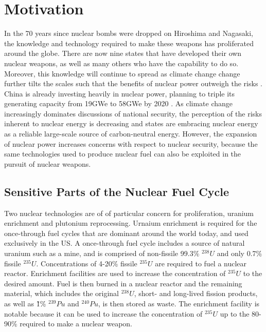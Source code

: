 \section{Motivation}
\label{s_motive}

In the 70 years since nuclear bombs were dropped on Hiroshima and Nagasaki, the knowledge and technology required to make these weapons has proliferated around the globe. There are now nine states that have developed their own nuclear weapons, as well as many others who have the capability to do so\cite{feiveson_unmaking_2014}.  Moreover, this knowledge will continue to spread as climate change change further tilts the scales such that the benefits of nuclear power outweigh the risks \cite{mooney_why_2014}.  China is already investing heavily in nuclear power, planning to triple its generating capacity from 19GWe to 58GWe by 2020  \cite{_china_2014}.  As climate change increasingly dominates discussions of national security, the perception of the risks inherent to nuclear energy is decreasing and states are embracing nuclear energy as a reliable large-scale source of carbon-neutral energy.  However, the expansion of nuclear power increases concerns with respect to nuclear security, because the same technologies used to produce nuclear fuel can also be exploited in the pursuit of nuclear weapons.


\subsection{Sensitive Parts of the Nuclear Fuel Cycle}

Two nuclear technologies are of of particular concern for proliferation, uranium enrichment and plutonium reprocessing.  Urnaium enrichment is required for the once-through fuel cycles that are dominant around the world today, and used exclusively in the US.  A once-through fuel cycle includes a source of natural uranium such as a mine, and is comprised of non-fissile 99.3\% $^{238}U$ and only 0.7\% fissile $^{235}U$. Concentrations of 4-20\% fissile $^{235}U$ are required to fuel a nuclear reactor. Enrichment facilities are used to increase the concentration of $^{235}U$ to the desired amount.  Fuel is then burned in a nuclear reactor and the remaining material, which includes the original $^{238}U$, short- and long-lived fission products, as well as \~1\% $^{239}Pu$ and $^{240}Pu$, is then stored as waste.  The enrichment facility is notable because it can be used to increase the concentration of $^{235}U$ up to the 80-90\% required to make a nuclear weapon\cite{_military_2014}.

